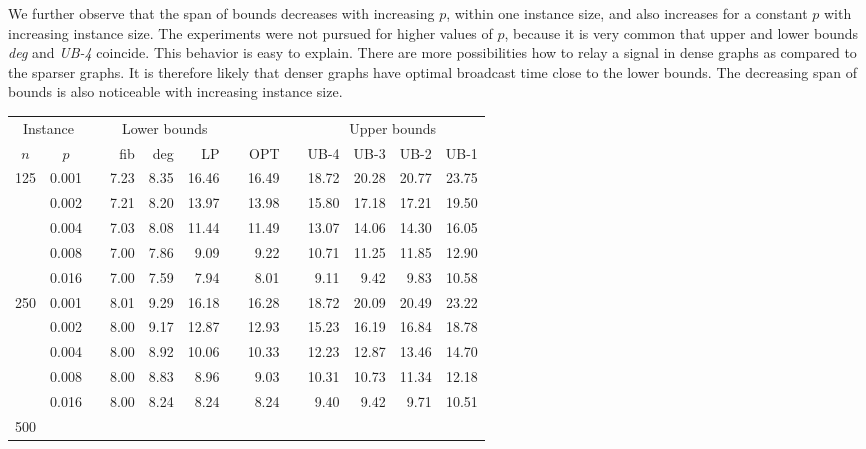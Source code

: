We further observe that the span of bounds decreases with increasing $p$, within one instance size, and also increases for a constant $p$ with increasing instance size.
The experiments were not pursued for higher values of $p$, because it is very common that upper and lower bounds \emph{deg} and \emph{UB-4} coincide.
This behavior is easy to explain.
There are more possibilities how to relay a signal in dense graphs as compared to the sparser graphs. 
It is therefore likely that denser graphs have optimal broadcast time close to the lower bounds.
The decreasing span of bounds is also noticeable with increasing instance size.

\begin{table}[]
\centering
\begin{tabular}{ccrrrrrrrrrrr}
\multicolumn{2}{c}{Instance} & &\multicolumn{3}{c}{Lower bounds} & & & &\multicolumn{4}{c}{Upper bounds} \\
\cline{1-2}\cline{4-6}\cline{10-13}
$n$ & $p$  &   & fib  & deg  & LP  &  & OPT & & UB-4  & UB-3  & UB-2  & UB-1  \\
\hline
\multirow{5}{*}{125} 
& 0.001 && 7.23 & 8.35 & 16.46 && 16.49 && 18.72 & 20.28 & 20.77 & 23.75 \\
& 0.002 && 7.21 & 8.20 & 13.97 && 13.98 && 15.80 & 17.18 & 17.21 & 19.50 \\
& 0.004 && 7.03 & 8.08 & 11.44 && 11.49 && 13.07 & 14.06 & 14.30 & 16.05 \\
& 0.008 && 7.00 & 7.86 & 9.09  && 9.22  && 10.71 & 11.25 & 11.85 & 12.90 \\
& 0.016 && 7.00 & 7.59 & 7.94  && 8.01  && 9.11  & 9.42  & 9.83  & 10.58 \\
\hline
\multirow{5}{*}{250} 
& 0.001 && 8.01 & 9.29 & 16.18 && 16.28 && 18.72 & 20.09 & 20.49 & 23.22 \\
& 0.002 && 8.00 & 9.17 & 12.87 && 12.93 && 15.23 & 16.19 & 16.84 & 18.78 \\
& 0.004 && 8.00 & 8.92 & 10.06 && 10.33 && 12.23 & 12.87 & 13.46 & 14.70 \\
& 0.008 && 8.00 & 8.83 & 8.96  && 9.03  && 10.31 & 10.73 & 11.34 & 12.18 \\
& 0.016 && 8.00 & 8.24 & 8.24  && 8.24  && 9.40  & 9.42  & 9.71  & 10.51 \\
\hline
\multirow{5}{*}{500} 

\end{tabular}
\end{table}
